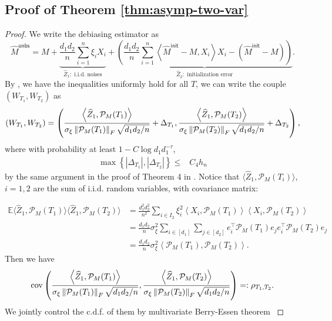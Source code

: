 \documentclass[12pt]{article}
\newcommand{\tF}{{\rm F}}
\newcommand{\abs}[1]{\left\lvert#1\right\rvert}
\newcommand{\norm}[1]{\left\lVert#1\right\rVert}
\newcommand{\E}{\mathbb{E}}
\newcommand{\cP}{\mathcal{P}}
\theoremstyle{plain}
\begin{document}
\subsection{Proof of Theorem \ref{thm:asymp-two-var}}
\begin{proof}
We write the debiasing estimator as 
\begin{equation*}
    \widehat{M}^{\mathsf {unbs }} = M+ \underbrace{\frac{d_1 d_2}{n} \sum_{i=1 }^n \xi_i X_i}_{\widehat{Z}_1: \text{ i.i.d. noises}} +\underbrace{\left(\frac{d_1 d_2}{n} \sum_{i=1 }^n\left\langle\widehat{M}^{\mathsf{init}} - M, X_i\right\rangle X_i-(\widehat{M}^{\mathsf{init}} -M)\right)}_{\widehat{Z}_2:\text{ initialization error} }.
\end{equation*}
By , we have the inequalities uniformly hold for all $T$, we can write the couple $(W_{T_1},W_{T_2})$ as 
$$
(W_{T_1},W_{T_2}) = \left(\frac{\left\langle  \widehat{Z}_1 , \cP_M(T_1) \right\rangle }{\sigma_{\xi} \norm{\cP_M(T_1) }_\tF  \sqrt{d_1 d_2/n}}+ \Delta_{T_1}, \frac{\left\langle  \widehat{Z}_1 , \cP_M(T_2) \right\rangle }{\sigma_{\xi} \norm{\cP_M(T_2) }_\tF  \sqrt{d_1 d_2/n}}+ \Delta_{T_2} \right),
$$
where with probability at least $1-C\log d_1 d_1^{-\tau}  $,
\begin{equation}\label{eq:2-d-remainder}
\begin{aligned}
     \max\left\{\abs{\Delta_{T_1}}, \abs{\Delta_{T_2}}\right\} \le & C_4 h_n
\end{aligned}
\end{equation}
by the same argument in the proof of Theorem 4 in \cite{ma2024statistical}. Notice that $\langle\widehat{Z}_1,\cP_M(T_i) \rangle$, $i=1,2$ are the sum of i.i.d. random variables, with covariance matrix:

\begin{equation*}
\begin{aligned}
         \E \langle\widehat{Z}_1,\cP_M(T_1) \rangle \langle\widehat{Z}_1,\cP_M(T_2) \rangle &= \frac{ d_1^2 d_2^2}{n^2} \sum_{i\in I_2} \xi_i^2 \left\langle  X_i, \cP_M(T_1) \right\rangle\left\langle X_i, \cP_M(T_2) \right\rangle \\
         & = \frac{ d_1 d_2}{n} \sigma_{\xi}^2 \sum_{i\in [d_1]}\sum_{j\in [d_2]} e_i^\top \cP_M(T_1)e_j e_i^\top \cP_M(T_2)e_j \\
         & = \frac{ d_1 d_2}{n} \sigma_{\xi}^2\left\langle  \cP_M(T_1), \cP_M(T_2) \right\rangle.
\end{aligned}
\end{equation*}
Then we have 
\begin{equation*}
    \operatorname{cov}\left(\frac{\left\langle  \widehat{Z}_1 , \cP_M(T_1) \right\rangle }{\sigma_{\xi} \norm{\cP_M(T_1) }_\tF  \sqrt{d_1 d_2/n}}, \frac{\left\langle  \widehat{Z}_1 , \cP_M(T_2) \right\rangle }{\sigma_{\xi} \norm{\cP_M(T_2) }_\tF  \sqrt{d_1 d_2/n}} \right) =:\rho_{T_1, T_2}.
\end{equation*}
We jointly control the c.d.f. of them by multivariate Berry-Essen theorem \citep{stein1972bound,raivc2019multivariate}


\end{proof}
\end{document}
